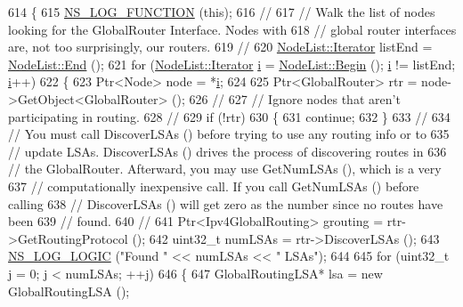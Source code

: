 \begin{DoxyCode}
614 \{
615   \hyperlink{log-macros-disabled_8h_a90b90d5bad1f39cb1b64923ea94c0761}{NS\_LOG\_FUNCTION} (\textcolor{keyword}{this});
616 \textcolor{comment}{//}
617 \textcolor{comment}{// Walk the list of nodes looking for the GlobalRouter Interface.  Nodes with}
618 \textcolor{comment}{// global router interfaces are, not too surprisingly, our routers.}
619 \textcolor{comment}{//}
620   \hyperlink{classns3_1_1NodeList_a9e2679a94efb4f0066cc21e65440364d}{NodeList::Iterator} listEnd = \hyperlink{classns3_1_1NodeList_a027a558c16e6078e25c7ffc67becb559}{NodeList::End} ();
621   \textcolor{keywordflow}{for} (\hyperlink{classns3_1_1NodeList_a9e2679a94efb4f0066cc21e65440364d}{NodeList::Iterator} \hyperlink{bernuolliDistribution_8m_a6f6ccfcf58b31cb6412107d9d5281426}{i} = \hyperlink{classns3_1_1NodeList_a93d2211831f5cb71d1dbb721e2721d7f}{NodeList::Begin} (); 
      \hyperlink{bernuolliDistribution_8m_a6f6ccfcf58b31cb6412107d9d5281426}{i} != listEnd; \hyperlink{bernuolliDistribution_8m_a6f6ccfcf58b31cb6412107d9d5281426}{i}++)
622     \{
623       Ptr<Node> node = *\hyperlink{bernuolliDistribution_8m_a6f6ccfcf58b31cb6412107d9d5281426}{i};
624 
625       Ptr<GlobalRouter> rtr = node->GetObject<GlobalRouter> ();
626 \textcolor{comment}{//}
627 \textcolor{comment}{// Ignore nodes that aren't participating in routing.}
628 \textcolor{comment}{//}
629       \textcolor{keywordflow}{if} (!rtr)
630         \{
631           \textcolor{keywordflow}{continue};
632         \}
633 \textcolor{comment}{//}
634 \textcolor{comment}{// You must call DiscoverLSAs () before trying to use any routing info or to}
635 \textcolor{comment}{// update LSAs.  DiscoverLSAs () drives the process of discovering routes in}
636 \textcolor{comment}{// the GlobalRouter.  Afterward, you may use GetNumLSAs (), which is a very}
637 \textcolor{comment}{// computationally inexpensive call.  If you call GetNumLSAs () before calling }
638 \textcolor{comment}{// DiscoverLSAs () will get zero as the number since no routes have been }
639 \textcolor{comment}{// found.}
640 \textcolor{comment}{//}
641       Ptr<Ipv4GlobalRouting> grouting = rtr->GetRoutingProtocol ();
642       uint32\_t numLSAs = rtr->DiscoverLSAs ();
643       \hyperlink{group__logging_ga88acd260151caf2db9c0fc84997f45ce}{NS\_LOG\_LOGIC} (\textcolor{stringliteral}{"Found "} << numLSAs << \textcolor{stringliteral}{" LSAs"});
644 
645       \textcolor{keywordflow}{for} (uint32\_t j = 0; j < numLSAs; ++j)
646         \{
647           GlobalRoutingLSA* lsa = \textcolor{keyword}{new} GlobalRoutingLSA ();

\end{DoxyCode}

